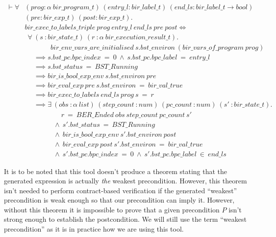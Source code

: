 \documentclass{kththesis}
\begin{document}
\begin{small}
\begin{equation}
\begin{split}
    \vdash \forall &(prog :\alpha~bir\_program\_t)~(entry\_l :bir\_label\_t)%
    ~(end\_ls :bir\_label\_t \rightarrow bool)\\
    & (pre :bir\_exp\_t)~(post :bir\_exp\_t).\\
    & bir\_exec\_to\_labels\_triple~prog~entry\_l~end\_ls~pre~post \Leftrightarrow\\
    & ~~\forall~(s~:bir\_state\_t)~(r~:\alpha~bir\_execution\_result\_t).\\
    & ~~~~~~~~~~~~~~~~~bir\_env\_vars\_are\_initialised~s.bst\_environ~(bir\_vars\_of\_program~prog)\\
    & ~~~~~~\implies s.bst\_pc.bpc\_index~=~0~\land~s.bst\_pc.bpc\_label~=~entry\_l\\
    & ~~~~~~\implies s.bst\_status~=~BST\_Running\\
    & ~~~~~~\implies bir\_is\_bool\_exp\_env~s.bst\_environ~pre\\
    & ~~~~~~\implies bir\_eval\_exp~pre~s.bst\_environ~=~bir\_val\_true\\
    & ~~~~~~\implies bir\_exec\_to\_labels~end\_ls~prog~s~=~r\\
    & ~~~~~~\implies \exists~(obs~:\alpha~list)~(step\_count~:num)%
    ~(pc\_count~:num)~(s'~:bir\_state\_t).\\
    & ~~~~~~~~~~~~~~~~~~~~~~~~r~=~BER\_Ended~obs~step\_count~pc\_count~s'\\
    & ~~~~~~~~~~~~~~~~~~~\land~s'.bst\_status~=~BST\_Running\\
    & ~~~~~~~~~~~~~~~~~~~\land~bir\_is\_bool\_exp\_env~s'.bst\_environ~post\\
    & ~~~~~~~~~~~~~~~~~~~\land~bir\_eval\_exp~post~s'.bst\_environ~=~bir\_val\_true\\
    & ~~~~~~~~~~~~~~~~~~~\land~s'.bst\_pc.bpc\_index~=~0~\land~s'.bst\_pc.bpc\_label~\in~end\_ls
\end{split}
\label{holba_wp_ht_thm}
\end{equation}
\end{small}

It is to be noted that this tool doesn't produce a theorem stating that the generated expression is actually \textit{the} weakest precondition. However, this theorem isn't needed to perform contract-based verification if the generated ``weakest'' precondition is weak enough so that our precondition can imply it. However, without this theorem it is impossible to prove that a given precondition $P$ isn't strong enough to establish the postcondition. We will still use the term ``weakest precondition'' as it is in practice how we are using this tool.
\end{document}
